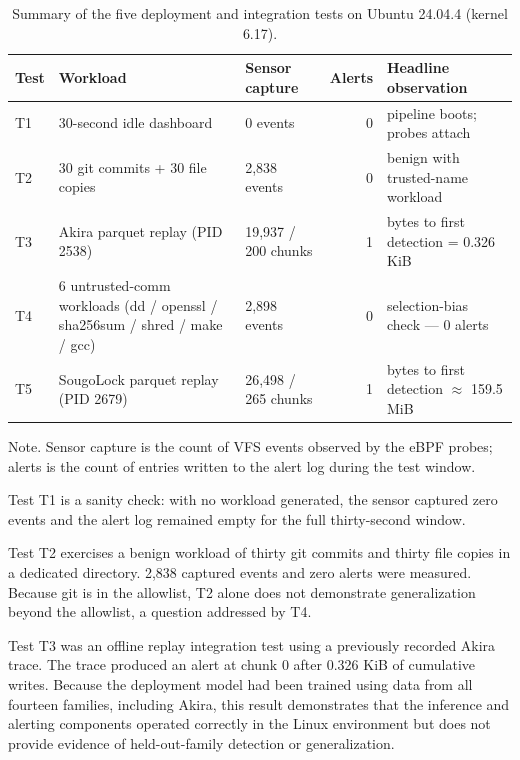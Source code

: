 \begin{table}[htbp]
\centering
\small
\caption{Summary of the five deployment and integration tests on Ubuntu 24.04.4 (kernel 6.17).}\label{tab:4-11}
\begin{tabularx}{\textwidth}{lXlrX}
\hline
\textbf{Test} & \textbf{Workload} & \textbf{Sensor capture} & \textbf{Alerts} & \textbf{Headline observation} \\
\hline
T1 & 30-second idle dashboard & 0 events & 0 & pipeline boots; probes attach \\
T2 & 30 git commits + 30 file copies & 2,838 events & 0 & benign with trusted-name workload \\
T3 & Akira parquet replay (PID 2538) & 19,937 /\allowbreak{} 200 chunks & 1 & bytes to first detection = 0.326 KiB \\
T4 & 6 untrusted-comm workloads (dd /\allowbreak{} openssl /\allowbreak{} sha256sum /\allowbreak{} shred /\allowbreak{} make /\allowbreak{} gcc) & 2,898 events & 0 & selection-bias check --- 0 alerts \\
T5 & SougoLock parquet replay (PID 2679) & 26,498 /\allowbreak{} 265 chunks & 1 & bytes to first detection $\approx$ 159.5 MiB \\
\hline
\end{tabularx}
\end{table}

Note. Sensor capture is the count of VFS events observed by the eBPF probes; alerts is the count of entries written to the alert log during the test window.

Test T1 is a sanity check: with no workload generated, the sensor captured zero events and the alert log remained empty for the full thirty-second window.

Test T2 exercises a benign workload of thirty git commits and thirty file copies in a dedicated directory. 2,838 captured events and zero alerts were measured. Because git is in the allowlist, T2 alone does not demonstrate generalization beyond the allowlist, a question addressed by T4.

Test T3 was an offline replay integration test using a previously recorded Akira trace. The trace produced an alert at chunk 0 after 0.326 KiB of cumulative writes. Because the deployment model had been trained using data from all fourteen families, including Akira, this result demonstrates that the inference and alerting components operated correctly in the Linux environment but does not provide evidence of held-out-family detection or generalization.

